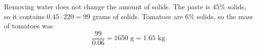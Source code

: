 Removing water does not change the amount of solids. The paste is $45\%$ solids, so it contains $0.45\cdot220=99$ grams of solids. Tomatoes are $6\%$ solids, so the mass of tomatoes was
\[
\dfrac{99}{0.06}=1650\text{ g}=\boxed{1.65\text{ kg}} .
\]
